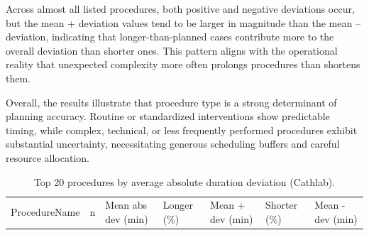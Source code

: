 \documentclass[
]{article}
\begin{document}
Across almost all listed procedures, both positive and negative
deviations occur, but the mean + deviation values tend to be larger in
magnitude than the mean -- deviation, indicating that
longer-than-planned cases contribute more to the overall deviation than
shorter ones. This pattern aligns with the operational reality that
unexpected complexity more often prolongs procedures than shortens them.

Overall, the results illustrate that procedure type is a strong
determinant of planning accuracy. Routine or standardized interventions
show predictable timing, while complex, technical, or less frequently
performed procedures exhibit substantial uncertainty, necessitating
generous scheduling buffers and careful resource allocation.

\begin{longtable}[]{@{}
  >{\centering\arraybackslash}p{}
  >{\centering\arraybackslash}p{}
  >{\centering\arraybackslash}p{}
  >{\centering\arraybackslash}p{}
  >{\centering\arraybackslash}p{}
  >{\centering\arraybackslash}p{}
  >{\centering\arraybackslash}p{}@{}}
\caption{Top 20 procedures by average absolute duration deviation
(Cathlab). \label{tab:duration_dev_proc}}\tabularnewline
\toprule\noalign{}
\begin{minipage}[b]{\linewidth}\centering
ProcedureName
\end{minipage} & \begin{minipage}[b]{\linewidth}\centering
n
\end{minipage} & \begin{minipage}[b]{\linewidth}\centering
Mean abs dev (min)
\end{minipage} & \begin{minipage}[b]{\linewidth}\centering
Longer (\%)
\end{minipage} & \begin{minipage}[b]{\linewidth}\centering
Mean + dev (min)
\end{minipage} & \begin{minipage}[b]{\linewidth}\centering
Shorter (\%)
\end{minipage} & \begin{minipage}[b]{\linewidth}\centering
Mean - dev (min)
\end{minipage} \\

\end{longtable}
\end{document}
